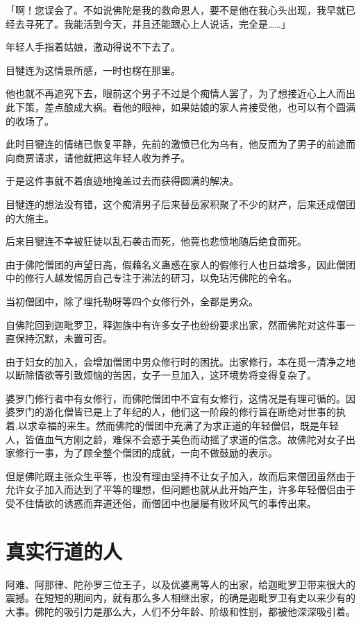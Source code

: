 \documentclass[twoside,openany]{book}
\begin{document}
「啊！您误会了。不如说佛陀是我的救命恩人，要不是他在我心头出现，我早就已经去寻死了。我能活到今天，并且还能跟心上人说话，完全是……」

年轻人手指着姑娘，激动得说不下去了。

目犍连为这情景所感，一时也楞在那里。

他也就不再追究下去，眼前这个男子不过是个痴情人罢了，为了想接近心上人而出此下策，差点酿成大祸。看他的眼神，如果姑娘的家人肯接受他，也可以有个圆满的收场了。

此时目犍连的情绪已恢复平静，先前的激愤已化为乌有，他反而为了男子的前途而向商贾请求，请他就把这年轻人收为养子。

于是这件事就不着痕迹地掩盖过去而获得圆满的解决。

目犍连的想法没有错，这个痴清男子后来替岳家积聚了不少的财产，后来还成僧团的大施主。

后来目犍连不幸被狂徒以乱石袭击而死，他竟也悲愤地随后绝食而死。

由于佛陀僧团的声望日高，假藉名义蛊惑在家人的假修行人也日益增多，因此僧团中的修行人越发惕厉自己专注于沸法的研习，以免玷污佛陀的令名。

当初僧团中，除了埋托勒呀等四个女修行外，全都是男众。

自佛陀回到迦毗罗卫，释迦族中有许多女子也纷纷要求出家，然而佛陀对这件事一直保持沉默，未置可否。

由于妇女的加入，会增加僧团中男众修行时的困扰。出家修行，本在觅一清净之地以断除情欲等引致烦恼的苦因，女子一旦加入，这环境势将变得复杂了。

婆罗门修行者中有女修行，而佛陀僧团中不宜有女修行，这情况是有理可循的。因婆罗门的游化僧皆已是上了年纪的人，他们这一阶段的修行旨在断绝对世事的执着,以求幸福的来生。然而佛陀的僧团中充满了为求正道的年轻僧侣，既是年轻人，皆值血气方刚之龄，难保不会惑于美色而动摇了求道的信念。故佛陀对女子出家修行一事，为了顾全整个僧团的成就，一向不做鼓励的表示。

但是佛陀既主张众生平等，也没有理由坚持不让女子加入，故而后来僧团虽然由于允许女子加入而达到了平等的理想，但问题也就从此开始产生，许多年轻僧侣由于受不住情欲的诱惑而弃道还俗，而僧团中也屡屡有败坏风气的事传出来。

\section{真实行道的人}\label{sec9.5}

阿难、阿那律、陀孙罗三位王子，以及优婆离等人的出家，给迦毗罗卫带来很大的震撼。在短短的期间内，就有那么多人相继出家，的确是迦毗罗卫有史以来少有的大事。佛陀的吸引力是那么大，人们不分年龄、阶级和性别，都被他深深吸引着。
\end{document}
